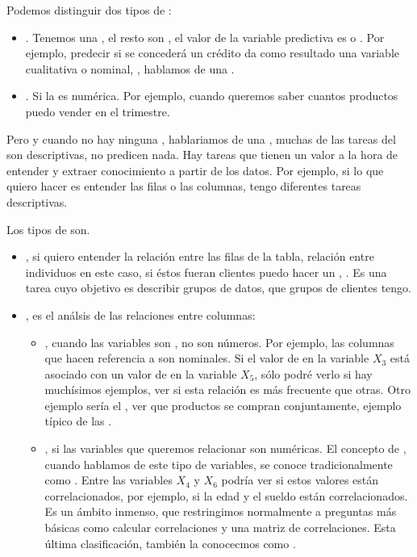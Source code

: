 Podemos distinguir dos tipos de :
\begin{itemize}
    \item {}. Tenemos una , el resto son , el valor de la variable predictiva es  o . Por ejemplo, predecir si se concederá un crédito da como resultado una variable cualitativa o nominal, , hablamos de una .
    \item {}. Si la  es numérica. Por ejemplo, cuando queremos saber cuantos productos puedo vender en el trimestre.
\end{itemize}

Pero y cuando no hay ninguna , hablariamos de una , muchas de las tareas del  son descriptivas, no predicen nada. Hay tareas  que tienen un valor a la hora de entender y extraer conocimiento a partir de los datos. Por ejemplo, si lo que quiero hacer es entender las filas o las columnas, tengo diferentes tareas descriptivas.

Los tipos de  son.
\begin{itemize}
    \item {}, si quiero entender la relación entre las filas de la tabla, relación entre individuos en este caso, si éstos fueran clientes puedo hacer un , . Es una tarea cuyo objetivo es describir grupos de datos, que grupos de clientes tengo.
    \item {}, es el análsis de las relaciones entre columnas:
    \begin{itemize}
        \item {}, cuando las variables son , no son números. Por ejemplo, las columnas que hacen referencia a  son nominales. Si el valor de  en la variable $X_3$ está asociado con un valor de  en la variable $X_5$, sólo podré verlo si hay muchísimos ejemplos, ver si esta relación es más frecuente que otras. Otro ejemplo sería el , ver que productos se compran conjuntamente, ejemplo típico de las .
        \item {}, si las variables que queremos relacionar son numéricas. El concepto de , cuando hablamos de este tipo de variables, se conoce tradicionalmente como . Entre las variables $X_4$ y $X_6$ podría ver si estos valores están correlacionados, por ejemplo, si la edad y el sueldo están correlacionados. Es un ámbito inmenso, que restringimos normalmente a preguntas más básicas como calcular correlaciones y una matriz de correlaciones. Esta última clasificación, también la conocecmos como .
    \end{itemize}
\end{itemize}


